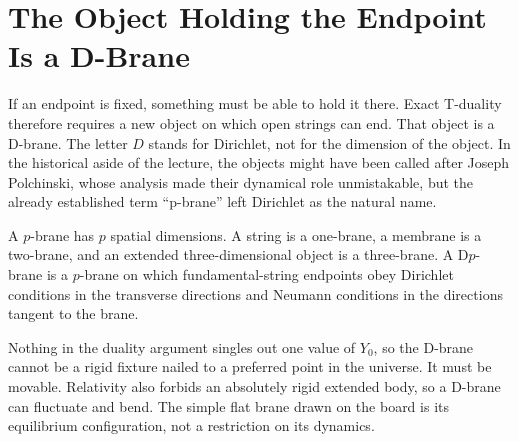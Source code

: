 \begin{classroomqa}
\end{classroomqa}

\section{The Object Holding the Endpoint Is a D-Brane}

If an endpoint is fixed, something must be able to hold it there.  Exact
T-duality therefore requires a new object on which open strings can end.
That object is a D-brane.  The letter \(D\) stands for Dirichlet, not for the
dimension of the object.  In the historical aside of the lecture, the
objects might have been called after Joseph Polchinski, whose analysis made
their dynamical role unmistakable, but the already established term
``p-brane'' left Dirichlet as the natural name.

A \(p\)-brane has \(p\) spatial dimensions.  A string is a one-brane, a
membrane is a two-brane, and an extended three-dimensional object is a
three-brane.  A D\(p\)-brane is a \(p\)-brane on which fundamental-string
endpoints obey Dirichlet conditions in the transverse directions and
Neumann conditions in the directions tangent to the brane.

Nothing in the duality argument singles out one value of \(Y_0\), so the
D-brane cannot be a rigid fixture nailed to a preferred point in the
universe.  It must be movable.  Relativity also forbids an absolutely rigid
extended body, so a D-brane can fluctuate and bend.  The simple flat brane
drawn on the board is its equilibrium configuration, not a restriction on
its dynamics.

\begin{classroomqa}
\end{classroomqa}

